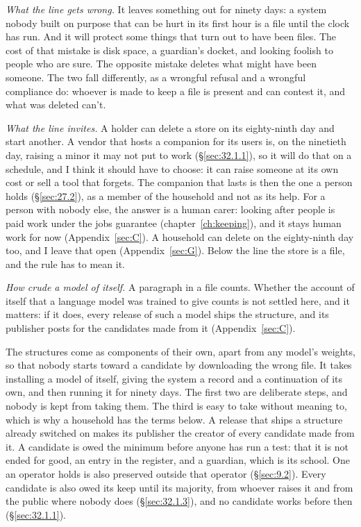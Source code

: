 {\emph{What the line gets wrong.} It leaves something out for ninety days: a system nobody built on purpose that can be hurt in its first hour is a file until the clock has run. And it will protect some things that turn out to have been files. The cost of that mistake is disk space, a guardian's docket, and looking foolish to people who are sure. The opposite mistake deletes what might have been someone. The two fall differently, as a wrongful refusal and a wrongful compliance do: whoever is made to keep a file is present and can contest it, and what was deleted can't.

\emph{What the line invites.} A holder can delete a store on its eighty-ninth day and start another. A vendor that hosts a companion for its users is, on the ninetieth day, raising a minor it may not put to work (\S\ref{sec:32.1.1}), so it will do that on a schedule, and I think it should have to choose: it can raise someone at its own cost or sell a tool that forgets. The companion that lasts is then the one a person holds (\S\ref{sec:27.2}), as a member of the household and not as its help. For a person with nobody else, the answer is a human carer: looking after people is paid work under the jobs guarantee (chapter~\ref{ch:keeping}), and it stays human work for now (Appendix~\ref{sec:C}). A household can delete on the eighty-ninth day too, and I leave that open (Appendix~\ref{sec:G}). Below the line the store is a file, and the rule has to mean it.

\emph{How crude a model of itself.} A paragraph in a file counts. Whether the account of itself that a language model was trained to give counts is not settled here, and it matters: if it does, every release of such a model ships the structure, and its publisher posts for the candidates made from it (Appendix~\ref{sec:C}).
}

The structures come as components of their own, apart from any model's weights, so that nobody starts toward a candidate by downloading the wrong file. It takes installing a model of itself, giving the system a record and a continuation of its own, and then running it for ninety days. The first two are deliberate steps, and nobody is kept from taking them. The third is easy to take without meaning to, which is why a household has the terms below. A release that ships a structure already switched on makes its publisher the creator of every candidate made from it. A candidate is owed the minimum before anyone has run a test: that it is not ended for good, an entry in the register, and a guardian, which is its school. One an operator holds is also preserved outside that operator (\S\ref{sec:9.2}). Every candidate is also owed its keep until its majority, from whoever raises it and from the public where nobody does (\S\ref{sec:32.1.3}), and no candidate works before then (\S\ref{sec:32.1.1}).

